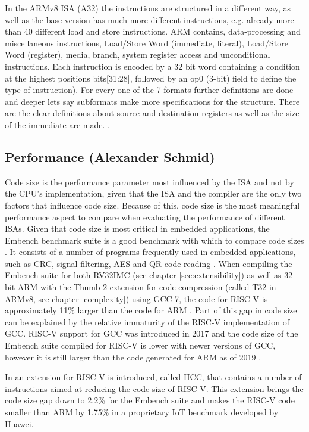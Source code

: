 \documentclass[conference]{IEEEtran}
\begin{document}
	In the ARMv8 \gls{ISA} (A32) the instructions are structured in a different way, as well as the base version has much more different instructions, e.g. already more than 40 different load and store instructions. ARM contains, data-processing and miscellaneous instructions, Load/Store Word (immediate, literal), Load/Store Word (register), media, branch, system register access and unconditional instructions.	Each instruction is encoded by a 32 bit word containing a condition at the highest positions bits[31:28], followed by an op0 (3-bit) field to define the type of instruction). For every one of the 7 formats further definitions are done and deeper lets say subformats make more specifications for the structure. There are the clear definitions about source and destination registers as well as the size of the immediate are made. \cite[page 4218 - 4278]{Arm2020}.
	
	\subsection{Performance (Alexander Schmid)}
	\label{performance}
	Code size is the performance parameter most influenced by the \gls{ISA} and not by the \gls{CPU}'s implementation,
	given that the \gls{ISA} and the compiler are the only two factors that influence code size.
	Because of this, code size is the most meaningful performance aspect to compare when evaluating the performance of different \glspl{ISA}.
	Given that code size is most critical in embedded applications, the Embench benchmark suite is a good benchmark
	with which to compare code sizes \cite{Patterson2019}. It consists of a number of programs frequently used in embedded
	applications, such as CRC, signal filtering, AES and QR code reading \cite{Patterson2019}.
	When compiling the Embench suite for both RV32IMC (see chapter \ref{sec:extensibility}) as well as 32-bit ARM with the Thumb-2 extension for code compression (called T32 in ARMv8, see chapter \ref{complexity}) using GCC 7,
	the code for RISC-V is approximately 11\% larger than the code for ARM \cite{Perotti2020}.
	Part of this gap in code size can be explained by the relative immaturity of the RISC-V implementation of
	GCC. RISC-V support for GCC was introduced in 2017 and the code size of the Embench suite
	compiled for RISC-V is lower with newer versions of GCC, however it is still larger than the code generated for ARM as of 2019 \cite{Patterson2019}.

	In \cite{Perotti2020} an extension for RISC-V is introduced, called HCC, that contains a number of instructions
	aimed at reducing the code size of RISC-V. This extension brings the code size gap down to 2.2\% for the Embench suite
	and makes the RISC-V code smaller than ARM by 1.75\% in a proprietary IoT benchmark developed by Huawei. \cite{Perotti2020}
	
\end{document}
